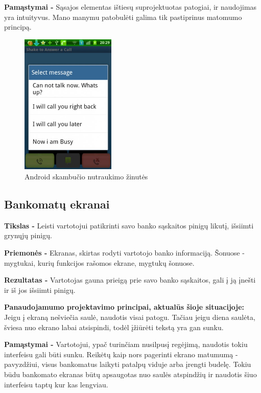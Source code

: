 ﻿\documentclass[a4paper, 12pt]{article}
\begin{document}
		\textbf{Pamąstymai -}
		Sąsajos elementas ištiesų suprojektuotas patogiai, ir naudojimas yra intuityvus.
		Mano manymu patobulėti galima tik pastiprinus matomumo principą. 

		\begin{figure}[h]
		\centering
		\includegraphics[width=0.4\textwidth]{images/android.jpg}
		\caption{Android skambučio nutraukimo žinutės}
		\label{korteles}
		\end{figure}
		\newpage %
	
	\subsection{Bankomatų ekranai}
		\textbf{Tikslas -}
		Leisti vartotojui patikrinti savo banko sąskaitos pinigų likutį, išsiimti grynųjų pinigų.

		\textbf{Priemonės -}
		Ekranas, skirtas rodyti vartotojo banko informaciją.
		Šonuose - mygtukai, kurių funkcijos rašomos ekrane, mygtukų šonuose.

		\textbf{Rezultatas -}
		Vartotojas gauna prieigą prie savo banko sąskaitos, gali į ją įnešti ir iš jos išsiimti pinigų.

		\textbf{Panaudojamumo projektavimo principai, aktualūs šioje situacijoje:}\\
		Jeigu į ekraną nešviečia saulė, naudotis visai patogu.
		Tačiau jeigu diena saulėta, šviesa nuo ekrano labai atsispindi, todėl įžiūrėti tekstą yra gan sunku.

		\textbf{Pamąstymai -}
		Vartotojui, ypač turinčiam nusilpusį regėjimą, naudotis tokiu interfeisu gali būti sunku.
		Reikėtų kaip nors pagerinti ekrano matumumą - pavyzdžiui, visus bankomatus laikyti patalpų viduje arba įrengti budelę.
		Tokiu būdu bankomato ekranas būtų apsaugotas nuo saulės atspindžių ir naudotis šiuo interfeisu taptų kur kas lengviau.
\end{document}
